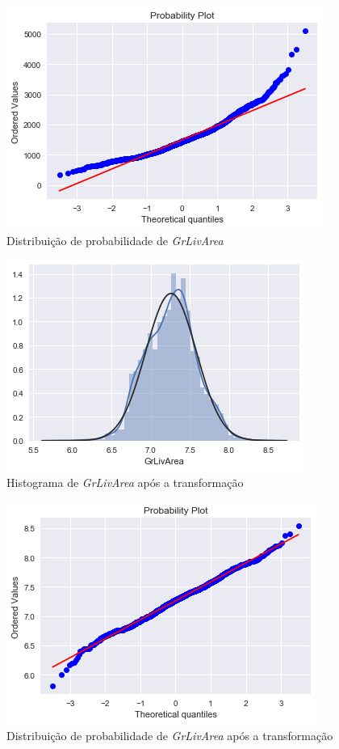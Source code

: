 \documentclass{article}
\begin{document}
			\begin{figure}[H]
				\centering
				\includegraphics[scale=0.8]{../img/grlivearea_norm_2}
				\caption{Distribuição de probabilidade de \textit{GrLivArea}}
			\end{figure}
			
			\begin{figure}[H]
				\centering
				\includegraphics[scale=0.8]{../img/grlivearea_norm_after_1}
				\caption{Histograma de \textit{GrLivArea} após a transformação}
			\end{figure}
			
			\begin{figure}[H]
				\centering
				\includegraphics[scale=0.8]{../img/grlivearea_norm_after_2}
				\caption{Distribuição de probabilidade de \textit{GrLivArea} após a transformação}
			\end{figure}
			
\end{document}
